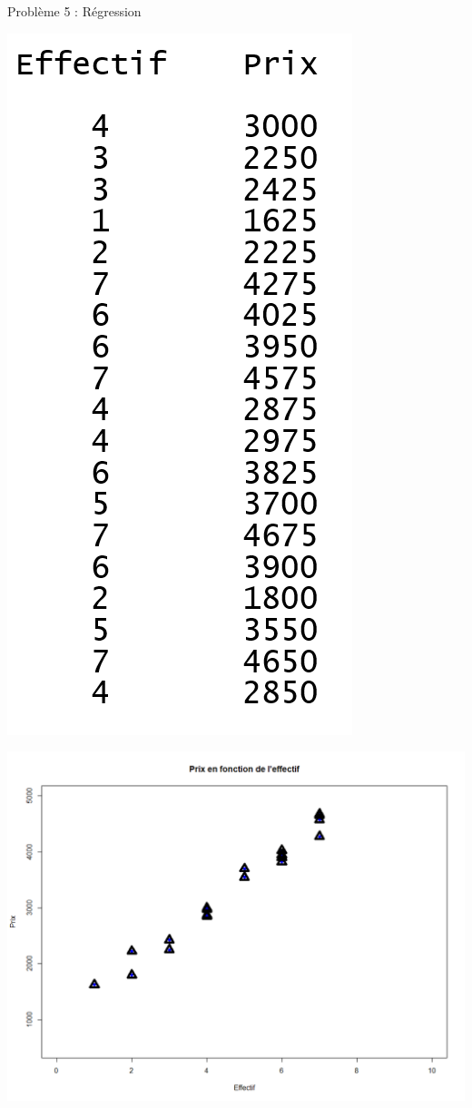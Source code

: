 \documentclass[10pt]{beamer}
\begin{document}
\begin{frame}{Problème 5 : Régression} 
\hspace{-0.12\textwidth}
\begin{minipage}{0.45\textwidth}
 \begin{center}
\includegraphics[height=\textwidth]{figures/data_coiffeur.PNG}
\end{center} 
\end{minipage}
\begin{minipage}{0.53\textwidth}
\begin{center}
\includegraphics[height=1\textwidth]{figures/reg0.png}
\end{center}
\end{minipage}


\end{frame}
\end{document}
